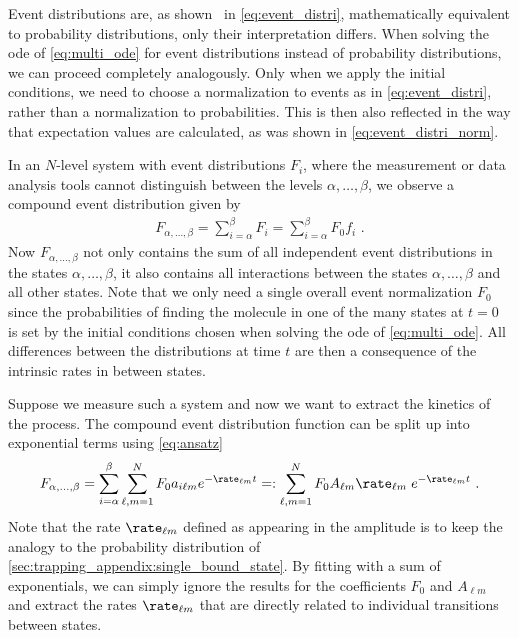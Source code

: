 Event distributions are, as shown \eg~in \cref{eq:event_distri}, mathematically equivalent to probability
distributions, only their interpretation differs. When solving the \gls{ode} of \cref{eq:multi_ode} for event
distributions instead of probability distributions, we can proceed completely analogously.  Only when we apply
the initial conditions, we need to choose a normalization to events as in \cref{eq:event_distri}, rather than
a normalization to probabilities. This is then also reflected in the way that expectation values are
calculated, as was shown in \cref{eq:event_distri_norm}.

In an $N$-level system with event distributions $F_i$, where the measurement or data analysis tools cannot
distinguish between the levels $\alpha,\dots,\beta$, we observe a compound event distribution given by
%
\begin{align*}
    F_{\alpha,\dots,\beta} = \sum_{i=\alpha}^{\beta} F_i
        = \sum_{i=\alpha}^{\beta} F_{0}f_i
    \text{ .}
\end{align*}
%
Now $F_{\alpha,\dots,\beta}$ not only contains the sum of all independent event distributions in the states
$\alpha,\dots,\beta$, it also contains all interactions between the states $\alpha,\dots,\beta$ and all other
states. Note that we only need a single overall event normalization $F_0$ since the probabilities of finding
the molecule in one of the many states at $t=0$ is set by the initial conditions chosen when solving the
\gls{ode} of \cref{eq:multi_ode}. All differences between the distributions at time $t$ are then a consequence
of the intrinsic rates in between states.

Suppose we measure such a system and now we want to extract the kinetics of the process. The compound event
distribution function can be split up into exponential terms using \cref{eq:ansatz}
%
\begin{align}\label{eq:compound_distri}
    F_{\alpha,\dots,\beta} =
        \sum_{i=\alpha}^\beta \sum_{\ell, m = 1}^N
            F_{0} a_{i\ell m} e^{- \rate_{\ell m} t}
    =: \sum_{\ell, m=1}^N F_{0} A_{\ell m} \rate_{\ell m} \;e^{-\rate_{\ell m} t}
    \text{ .}
\end{align}
%
Note that the rate $\rate_{\ell m}$ defined as appearing in the amplitude is to keep the analogy to the
probability distribution of \cref{sec:trapping_appendix:single_bound_state}.  By fitting with a sum of
exponentials, we can simply ignore the results for the coefficients $F_{0}$ and $A_{\ell m}$ and extract the
rates $\rate_{\ell m}$ that are directly related to individual transitions between states.

